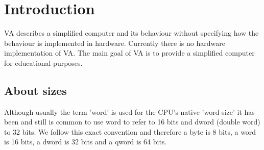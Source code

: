 \section{Introduction}

VA describes a simplified computer and its behaviour without specifying how the behaviour is implemented in hardware. 
Currently there is no hardware implementation of VA. The main goal of VA is to provide a simplified
computer for educational purposes. 

\subsection{About sizes}

Although usually the term 'word' is used for the CPU's native 'word size' it has been and still is common to use word to refer to 16 bits and dword (double word) to 32 bits. We follow this exact convention and therefore a byte is 8 bits, a word is 16 bits, a dword is 32 bits and a qword is 64 bits. 


\newpage
